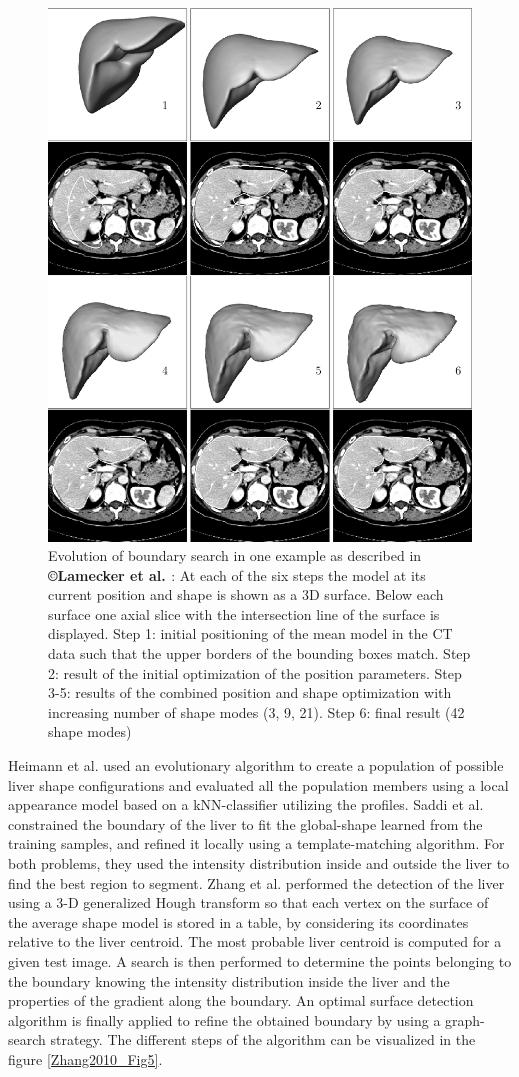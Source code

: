 \begin{figure}[ht!]
	\centering
	\includegraphics[width=0.6\linewidth]{images/Lamecker2004_Fig9}
	\caption{Evolution of boundary search in one example as described in \textbf{©Lamecker et al. \cite{Lamecker2004}}: At each of the six steps the model at its current position and shape is shown as a 3D surface. Below each surface one axial slice with the intersection line of the surface is displayed. Step 1: initial positioning of the mean model in the CT data such that the upper borders of the bounding boxes match. Step 2: result of the initial optimization of the position parameters. Step 3-5: results of the combined position and shape optimization with increasing number of shape modes (3, 9, 21). Step 6: final result (42 shape modes)}
	\label{Lamecker2004_Fig9}
\end{figure}


Heimann et al. \cite{Heimann2007} used an evolutionary algorithm to create a population of
possible liver shape configurations and evaluated all the population members
using a local appearance model based on a kNN-classifier utilizing the
profiles.  Saddi et al. \cite{Saddi2007} constrained the boundary of the liver to fit the
global-shape learned from the training samples, and refined it locally
using a template-matching algorithm. For both problems, they used the
intensity distribution inside and outside the liver to find the best
region to segment. Zhang et al. \cite{Zhang2010} performed the detection of the liver using a 3-D
generalized Hough transform so that each vertex on the surface of the
average shape model is stored in a table, by considering its coordinates
relative to the liver centroid. The most probable liver centroid is
computed for a given test image. A search is then performed to determine
the points belonging to the boundary knowing the intensity distribution
inside the liver and the properties of the gradient along the boundary.
An optimal surface detection algorithm is finally applied to refine the
obtained boundary by using a graph-search strategy. The different steps
of the algorithm can be visualized in the figure \ref{Zhang2010_Fig5}.

